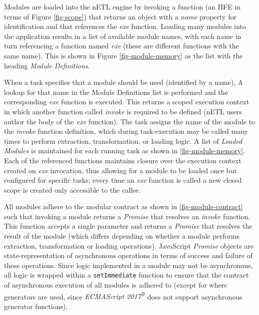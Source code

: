 

Modules are loaded into the nETL engine by invoking a function (an IIFE in terms of Figure \ref{fig-scope}) that returns an object with a \textit{name} property for identification and that references the \textit{exe} function. Loading many modules into the application results in a list of available module names, with each name in turn referencing a function named \textit{exe} (these are different functions with the same name). This is shown in Figure \ref{fig-module-memory} as the list with the heading \textit{Module Definitions}.

When a task specifies that a module should be used (identified by a name), A lookup for that name in the Module Definitions list is performed and the corresponding \textit{exe} function is executed. This returns a scoped execution context\cite{executionContext} in which another function called \textit{invoke} is required to be defined (nETL users author the body of the \textit{exe} function). The task assigns the name of the module to the \textit{invoke} function definition, which during task-execution may be called many times to perform extraction, transformation, or loading logic. A list of \textit{Loaded Modules} is maintained for each running task as shown in \ref{fig-module-memory}. Each of the referenced functions maintains closure over the execution context created on \textit{exe} invocation, thus allowing for a module to be loaded once but configured for specific tasks; every time an \textit{exe} function is called a new closed scope is created only accessible to the callee.



All modules adhere to the modular contract as shown in \ref{fig-module-contract} such that invoking a module returns a \textit{Promise} \cite{jsPromises} that resolves an \textit{invoke} function. This function accepts a single parameter and returns a \textit{Promise} that resolves the result of the module (which differs depending on whether a module performs extraction, transformation or loading operations). JavaScript \textit{Promise} objects are state-representation of asynchronous operations in terms of success and failure of these operations. Since logic implemented in a module may not be asynchronous, all logic is wrapped within a \texttt{setImmediate} function to ensure that the contract of asynchronous execution of all modules is adhered to (except for where generators are used, since \textit{ECMAScript 2017\textsuperscript{®}} does not support asynchronous generator functions).

